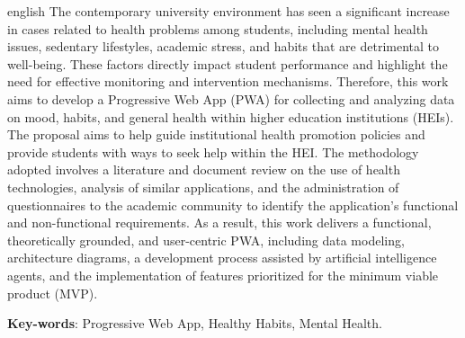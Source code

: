 \begin{resumo}[Abstract]
 \begin{otherlanguage*}{english}
   The contemporary university environment has seen a significant increase in cases related to health problems among students, including mental health issues, sedentary lifestyles, academic stress, and habits that are detrimental to well-being. These factors directly impact student performance and highlight the need for effective monitoring and intervention mechanisms. Therefore, this work aims to develop a Progressive Web App (PWA) for collecting and analyzing data on mood, habits, and general health within higher education institutions (HEIs). The proposal aims to help guide institutional health promotion policies and provide students with ways to seek help within the HEI. The methodology adopted involves a literature and document review on the use of health technologies, analysis of similar applications, and the administration of questionnaires to the academic community to identify the application's functional and non-functional requirements. As a result, this work delivers a functional, theoretically grounded, and user-centric PWA, including data modeling, architecture diagrams, a development process assisted by artificial intelligence agents, and the implementation of features prioritized for the minimum viable product (MVP).

   \vspace{\onelineskip}
 
   \noindent 
   \textbf{Key-words}: Progressive Web App, Healthy Habits, Mental Health.
 \end{otherlanguage*}
\end{resumo}
